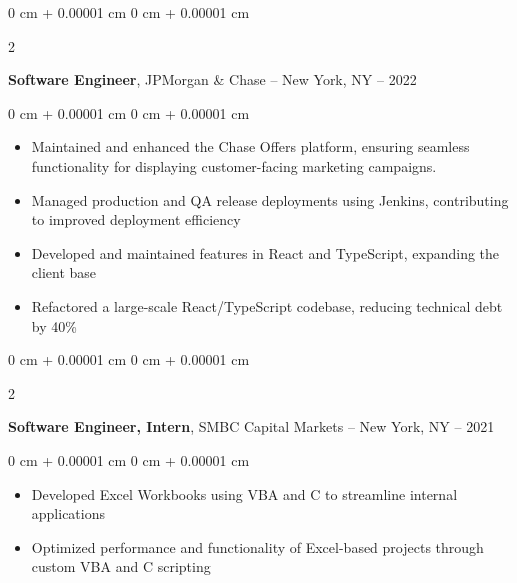 \documentclass[10pt, letterpaper]{article}
\newenvironment{highlights}{
    \begin{itemize}[
        topsep=0.10 cm,
        parsep=0.10 cm,
        partopsep=0pt,
        itemsep=0pt,
        leftmargin=0 cm + 10pt
    ]
}{
    \end{itemize}
} %
\newenvironment{onecolentry}{
    \begin{adjustwidth}{
        0 cm + 0.00001 cm
    }{
        0 cm + 0.00001 cm
    }
}{
    \end{adjustwidth}
} %
\newenvironment{twocolentry}[2][]{
    \onecolentry
    \def\secondColumn{#2}
    \setcolumnwidth{\fill, 4.5 cm}
    \begin{paracol}{2}
}{
    \switchcolumn \raggedleft \secondColumn
    \end{paracol}
    \endonecolentry
} %
\begin{document}
        \vspace{0.4 cm}

        \begin{twocolentry}{
            2021 -- 2022
        }
            \textbf{Software Engineer}, JPMorgan \& Chase -- New York, NY\end{twocolentry}

        \vspace{0.10 cm}
        \begin{onecolentry}
            \begin{highlights}
                \item Maintained and enhanced the Chase Offers platform, ensuring seamless functionality for displaying customer-facing marketing campaigns.
                \item Managed production and QA release deployments using Jenkins, contributing to improved deployment efficiency
                \item Developed and maintained features in React and TypeScript, expanding the client base
                \item Refactored a large-scale React/TypeScript codebase, reducing technical debt by 40\%
            \end{highlights}
        \end{onecolentry}


        \vspace{0.35 cm}

        \begin{twocolentry}{
            2020 -- 2021
        }
            \textbf{Software Engineer, Intern}, SMBC Capital Markets -- New York, NY\end{twocolentry}

        \vspace{0.10 cm}
        \begin{onecolentry}
            \begin{highlights}
                \item Developed Excel Workbooks using VBA and C to streamline internal applications
                \item Optimized performance and functionality of Excel-based projects through custom VBA and C scripting
            \end{highlights}
        \end{onecolentry}


        \vspace{0.35 cm}
\end{document}
